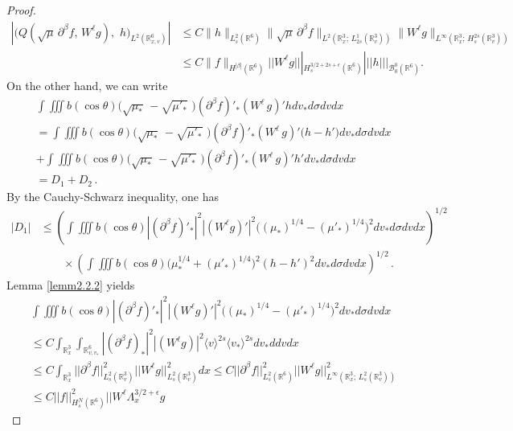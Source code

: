 \documentclass{amsart}[12pt, article]
\begin{document}
\begin{proof}
\begin{align*}
 \left|\Big(Q(\sqrt{\mu}\,
 \partial^{\beta}  f,\,  W^\ell g) ,\,\,
 h\Big)_{L^2({{{\mathbb R}}}^6_{x, v})}\right|&\leq C\|h\|_{L^2_s({{{\mathbb R}}}^6)}\| \sqrt{\mu}\,
 \partial^{\beta} f\|_{L^2({{{\mathbb R}}}^3_x;\, L^1_{2s}({{{\mathbb R}}}^3_v))}
 \|W^\ell g\|_{L^\infty({{{\mathbb R}}}^3_x;\, H^{2s}_s({{{\mathbb R}}}^3_v))}\\
& \leq C \| f\|_{H^{|\beta|}({{{\mathbb R}}}^6)} ||W^\ell
g|||_{H^{3/2+2s+\epsilon}_s({{{\mathbb R}}}^6)} |||h|||_{{{\mathcal B}}^0_0({{{\mathbb R}}}^6)}.
 \end{align*}
On the other hand, we can write
\begin{align*}
&\int\iiint b(\cos\theta) \Big(\sqrt{\mu_*}\,
-\sqrt{\mu'_*}\,\,\Big)(\partial^{\beta} f)'_*
(W^\ell\,g)' h d v_* d \sigma dvdx\,\\
&=\int\iiint b(\cos\theta) \Big(\sqrt{\mu_*}\,
-\sqrt{\mu'_*}\,\,\Big)(\partial^{\beta}f)'_*
(W^\ell\,g)' \Big(h-h'\Big) d v_* d \sigma dvdx\\
& +\int\iiint b(\cos\theta) \Big(\sqrt{\mu_*}\,
-\sqrt{\mu'_*}\,\,\Big)(\partial^{\beta} f)'_*
(W^\ell\,g)' h' d v_* d \sigma dvdx\\
&= D_1 + D_2\,.
\end{align*}
By the Cauchy-Schwarz inequality, one has
\begin{align*}
|D_1| &\leq \left(\int\iiint b(\cos\theta) | (\partial^\beta
f)'_\ast |^2 |(W^\ell g )'|^2 \Big((\mu_*)^{1/4} -
(\mu'_*)^{1/4}\Big)^2 d v_* d
\sigma dvdx\right)^{1/2}\\
&\qquad\times \left(\int\iiint b(\cos\theta) \Big( \mu^{1/4}_\ast +
(\mu'_*)^{1/4} \Big)^2 (h-h')^2 d v_* d \sigma dvdx\right)^{1/2}\, .
\end{align*}
Lemma \ref{lemm2.2.2} yields
\begin{align*}
&\int\iiint b(\cos\theta) | (\partial^\beta f)'_\ast |^2 |(W^\ell g
)'|^2 \Big((\mu_*)^{1/4} - (\mu'_*)^{1/4}\Big)^2 d v_* d \sigma
dvdx\\
&\leq C \int_{{{{\mathbb R}}}^3_x}\int_{{{{\mathbb R}}}^6_{v, v_*}} | (\partial^\beta
f)_\ast |^2 |(W^\ell g )|^2 \langle v\rangle^{2s}\langle
v_*\rangle^{2s} d v_* d dvdx
\\
&\leq C \int_{{{{\mathbb R}}}^3_x}||\partial^\beta f||^2_{L^2_s({{{\mathbb R}}}^3_v)}
||W^\ell g ||^2_{L^2_s({{{\mathbb R}}}^3_v)} dx \leq C ||\partial^\beta
f||^2_{L^2_s({{{\mathbb R}}}^6)}
||W^\ell g ||^2_{L^\infty({{{\mathbb R}}}^3_x;\, L^2_s({{{\mathbb R}}}^3_v))}\\
&\leq C ||f||^2_{H^N_s({{{\mathbb R}}}^6)} ||W^\ell \Lambda^{3/2+\epsilon}_x g

\end{align*}
\end{proof}
\end{document}
